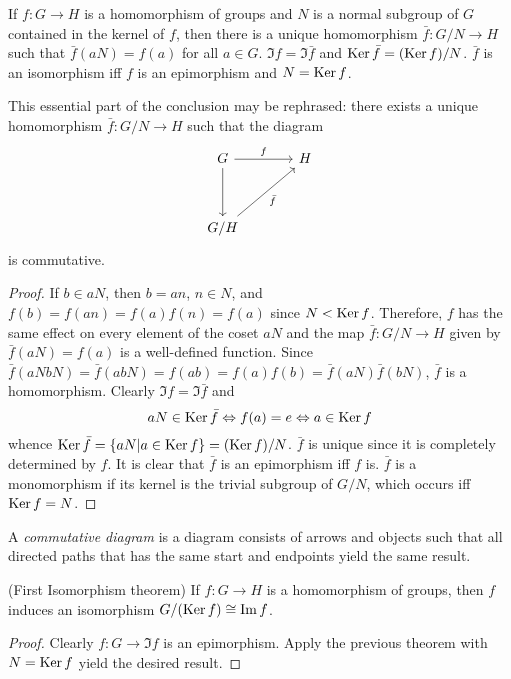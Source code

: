 \begin{theorem}
	If $ f:G \to H $ is a homomorphism of groups and $ N $ is a normal subgroup of $ G $ contained in the kernel of $ f $, then there is a unique homomorphism $ \bar{f}:G/N \to H $ such that $ \bar{f}(aN)=f(a) $ for all $ a \in G $. $ \Im f = \Im \bar{f} $ and $ \operatorname{Ker} \bar{f}=(\operatorname{Ker} f)/N $. $ \bar{f} $ is an isomorphism iff $ f$ is an epimorphism and $ N = \operatorname{Ker} f$. 
\end{theorem}
This essential part of the conclusion may be rephrased: there exists a unique homomorphism $ \bar{f}:G/N \to H $ such that the diagram
\begin{equation}
	\begin{tikzcd}[row sep=3.5em,column sep=3.5em]
	G \arrow[r,"f"] \arrow[d] & H \\
	G/H \arrow[ru,"\bar{f}"']
	\end{tikzcd} \nonumber
\end{equation}
is commutative.
\begin{proof}
	If $ b \in aN $, then $ b=an $, $ n \in N $, and $ f(b)=f(an)=f(a)f(n)=f(a) $ since $ N < \operatorname{Ker} f $. Therefore, $ f $ has the same effect on every element of the coset $ aN $ and the map $ \bar{f}:G/N \to H $ given by $ \bar{f}(aN)=f(a) $ is a well-defined function. Since $ \bar{f}(aNbN)=\bar{f}(abN)=f(ab)=f(a)f(b)=\bar{f}(aN)\bar{f}(bN) $, $ \bar{f} $ is a homomorphism. Clearly $ \Im f = \Im \bar{f} $ and
	\begin{equation}
		aN \in \operatorname{Ker} \bar{f} \Leftrightarrow f(a)=e \Leftrightarrow a \in \operatorname{Ker} f \nonumber
	\end{equation}
	whence $ \operatorname{Ker} \bar{f}=\{aN|a \in \operatorname{Ker} f \} = (\operatorname{Ker} f)/N $. $ \bar{f} $ is unique since it is completely determined by $ f $. It is clear that $ \bar{f} $ is an epimorphism iff $ f$ is. $ \bar{f}$ is a monomorphism if its kernel is the trivial subgroup of $ G/N $, which occurs iff $ \operatorname{Ker} f = N $.
\end{proof}
\begin{definition}
	A \textit{commutative diagram} is a diagram consists of arrows and objects such that all directed paths that has the same start and endpoints yield the same result.
\end{definition}
\begin{Corollary}(First Isomorphism theorem)
	If $ f:G \to H $ is a homomorphism of groups, then $ f $ induces an isomorphism $ G/(\operatorname{Ker} f)\cong \operatorname{Im} f $.
\end{Corollary}
\begin{proof}
	Clearly $ f:G \to \Im f $ is an epimorphism. Apply the previous theorem with $ N=\operatorname{Ker} f $ yield the desired result.
\end{proof}
